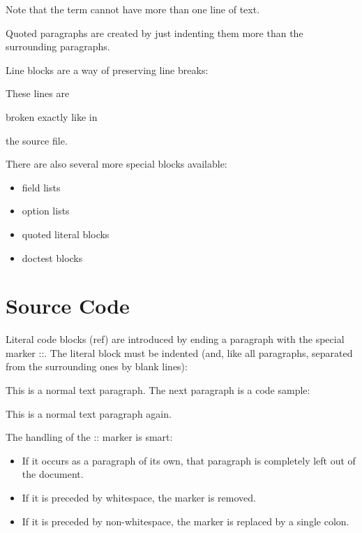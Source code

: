 \documentclass[letterpaper,10pt,english]{sphinxmanual}
\begin{document}
Note that the term cannot have more than one line of text.

Quoted paragraphs are created by just indenting them more than the surrounding paragraphs.

Line blocks are a way of preserving line breaks:

\begin{DUlineblock}{0em}
\item[] These lines are
\item[] broken exactly like in
\item[] the source file.
\end{DUlineblock}

There are also several more special blocks available:
\begin{itemize}
\item {} 
field lists

\item {} 
option lists

\item {} 
quoted literal blocks

\item {} 
doctest blocks

\end{itemize}


\section{Source Code}
\label{\detokenize{usage/introduction:source-code}}
Literal code blocks (ref) are introduced by ending a paragraph with the special marker ::.
The literal block must be indented (and, like all paragraphs, separated from the surrounding ones by blank lines):

This is a normal text paragraph. The next paragraph is a code sample:

\begin{sphinxVerbatim}[commandchars=\\\{\}]
       
    

    
\end{sphinxVerbatim}

This is a normal text paragraph again.

The handling of the :: marker is smart:
\begin{itemize}
\item {} 
If it occurs as a paragraph of its own, that paragraph is completely left out of the document.

\item {} 
If it is preceded by whitespace, the marker is removed.

\item {} 
If it is preceded by non-whitespace, the marker is replaced by a single colon.

\end{itemize}
\end{document}
